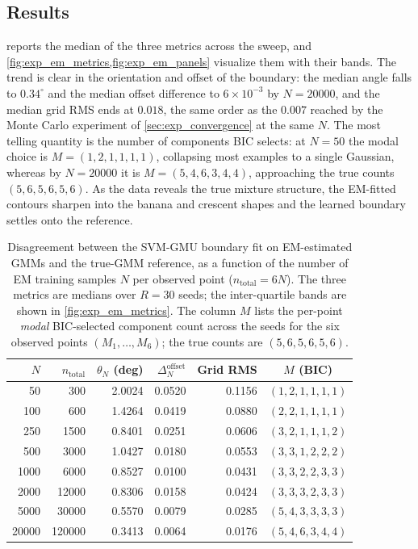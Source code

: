 \documentclass[11pt, letterpaper]{article}
\begin{document}
\subsection{Results}

 reports the median of the three metrics across the sweep, and \cref{fig:exp_em_metrics,fig:exp_em_panels} visualize them with their bands. The trend is clear in the orientation and offset of the boundary: the median angle falls to $0.34^{\circ}$ and the median offset difference to $6 \times 10^{-3}$ by $N = 20000$, and the median grid RMS ends at $0.018$, the same order as the $0.007$ reached by the Monte Carlo experiment of \cref{sec:exp_convergence} at the same $N$. The most telling quantity is the number of components BIC selects: at $N = 50$ the modal choice is $M = (1, 2, 1, 1, 1, 1)$, collapsing most examples to a single Gaussian, whereas by $N = 20000$ it is $M = (5, 4, 6, 3, 4, 4)$, approaching the true counts $(5, 6, 5, 6, 5, 6)$. As the data reveals the true mixture structure, the EM-fitted contours sharpen into the banana and crescent shapes and the learned boundary settles onto the reference.

\begin{table}[H]
    \centering
    \caption{Disagreement between the SVM-GMU boundary fit on EM-estimated GMMs and the true-GMM reference, as a function of the number of EM training samples $N$ per observed point ($n_{\text{total}} = 6N$). The three metrics are medians over $R = 30$ seeds; the inter-quartile bands are shown in \cref{fig:exp_em_metrics}. The column $M$ lists the per-point \emph{modal} BIC-selected component count across the seeds for the six observed points $(M_1, \ldots, M_6)$; the true counts are $(5, 6, 5, 6, 5, 6)$.}
    \label{tab:exp_em_metrics}
    \begin{tabular}{@{}rrrrrc@{}}
        \toprule
        $N$ & $n_{\text{total}}$ & $\theta_N$ (deg) & $\Delta_N^{\text{offset}}$ & Grid RMS & $M$ (BIC) \\
        \midrule
        50    & 300    & 2.0024 & 0.0520 & 0.1156 & $(1, 2, 1, 1, 1, 1)$ \\
        100   & 600    & 1.4264 & 0.0419 & 0.0880 & $(2, 2, 1, 1, 1, 1)$ \\
        250   & 1500   & 0.8401 & 0.0251 & 0.0606 & $(3, 2, 1, 1, 1, 2)$ \\
        500   & 3000   & 1.0427 & 0.0180 & 0.0553 & $(3, 3, 1, 2, 2, 2)$ \\
        1000  & 6000   & 0.8527 & 0.0100 & 0.0431 & $(3, 3, 2, 2, 3, 3)$ \\
        2000  & 12000  & 0.8306 & 0.0158 & 0.0424 & $(3, 3, 3, 2, 3, 3)$ \\
        5000  & 30000  & 0.5570 & 0.0079 & 0.0285 & $(5, 4, 3, 3, 3, 3)$ \\
        20000 & 120000 & 0.3413 & 0.0064 & 0.0176 & $(5, 4, 6, 3, 4, 4)$ \\
        \bottomrule
    \end{tabular}
\end{table}
\end{document}
